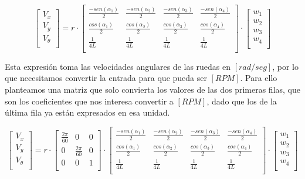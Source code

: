 $$ \begin{bmatrix} V_x \\ V_y \\ V_\theta \\ \end{bmatrix} = 
    r
    \cdot 
    \begin{bmatrix}
        {\frac{-sen(\alpha_1)}{2}} & {\frac{-sen(\alpha_2)}{2}} & {\frac{-sen(\alpha_3)}{2}} & {\frac{-sen(\alpha_4)}{2}} \\
        {\frac{cos(\alpha_1)}{2}}  & {\frac{cos(\alpha_2)}{2}}  & {\frac{cos(\alpha_3)}{2}}  & {\frac{cos(\alpha_4)}{2}}  \\
        {\frac{1}{4L}}  & {\frac{1}{4L}}  & {\frac{1}{4L}}  & {\frac{1}{4L}}  \\
    \end{bmatrix}
    \cdot
    \begin{bmatrix} w_1 \\ w_2 \\ w_3 \\ w_4 \\ \end{bmatrix} $$

Esta expresión toma las velocidades angulares de las ruedas en $[rad/seg]$, por lo que necesitamos convertir la entrada para que pueda ser $[RPM]$. Para ello planteamos una matriz que solo convierta los valores de las dos primeras filas, que son los coeficientes que nos interesa convertir a $[RPM]$, dado que los de la última fila ya están expresados en esa unidad.

$$ \begin{bmatrix} V_x \\ V_y \\ V_\theta \\ \end{bmatrix} = 
    r
    \cdot 
    \begin{bmatrix}
        {\frac{2\pi}{60}} & {0} & {0}  \\
        {0} & {\frac{2\pi}{60}} & {0} \\
        {0} & {0} & {1} \\
    \end{bmatrix}
    \cdot
    \begin{bmatrix}
        {\frac{-sen(\alpha_1)}{2}} & {\frac{-sen(\alpha_2)}{2}} & {\frac{-sen(\alpha_3)}{2}} & {\frac{-sen(\alpha_4)}{2}} \\
        {\frac{cos(\alpha_1)}{2}}  & {\frac{cos(\alpha_2)}{2}}  & {\frac{cos(\alpha_3)}{2}}  & {\frac{cos(\alpha_4)}{2}}  \\
        {\frac{1}{4L}}  & {\frac{1}{4L}}  & {\frac{1}{4L}}  & {\frac{1}{4L}}  \\
    \end{bmatrix}
    \cdot
    \begin{bmatrix} w_1 \\ w_2 \\ w_3 \\ w_4 \\ \end{bmatrix} $$


